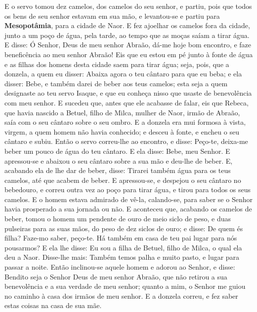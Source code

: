 E o servo tomou dez camelos, dos camelos do seu senhor, e partiu,
pois que todos os bens de seu senhor estavam em sua mão, e
levantou-se e partiu para \textbf{Mesopotâmia}, para a cidade de
Naor. E fez ajoelhar os camelos fora da cidade, junto a um
poço de água, pela tarde, ao tempo que as moças saíam a tirar água.
E disse: Ó Senhor, Deus de meu senhor Abraão, dá-me hoje bom
encontro, e faze beneficência ao meu senhor Abraão! Eis que
eu estou em pé junto à fonte de água e as filhas dos homens desta
cidade saem para tirar água; seja, pois, que a donzela, a
quem eu disser: Abaixa agora o teu cântaro para que eu beba; e ela
disser: Bebe, e também darei de beber aos teus camelos; esta seja a
quem designaste ao teu servo Isaque, e que eu conheça nisso que
usaste de benevolência com meu senhor. E sucedeu que, antes
que ele acabasse de falar, eis que Rebeca, que havia nascido a
Betuel, filho de Milca, mulher de Naor, irmão de Abraão, saía com o
seu cântaro sobre o seu ombro. E a donzela era mui formosa à
vista, virgem, a quem homem não havia conhecido; e desceu à fonte, e
encheu o seu cântaro e subiu. Então o servo correu-lhe ao
encontro, e disse: Peço-te, deixa-me beber um pouco de água do teu
cântaro. E ela disse: Bebe, meu Senhor. E apressou-se e
abaixou o seu cântaro sobre a sua mão e deu-lhe de beber. E,
acabando ela de lhe dar de beber, disse: Tirarei também água para os
teus camelos, até que acabem de beber. E apressou-se, e
despejou o seu cântaro no bebedouro, e correu outra vez ao poço para
tirar água, e tirou para todos os seus camelos. E o homem
estava admirado de vê-la, calando-se, para saber se o Senhor havia
prosperado a sua jornada ou não. E aconteceu que, acabando os
camelos de beber, tomou o homem um pendente de ouro de meio siclo de
peso, e duas pulseiras para as suas mãos, do peso de dez siclos de
ouro; e disse: De quem és filha? Faze-mo saber, peço-te. Há
também em casa de teu pai lugar para nós pousarmos? E ela lhe
disse: Eu sou a filha de Betuel, filho de Milca, o qual ela deu a
Naor. Disse-lhe mais: Também temos palha e muito pasto, e
lugar para passar a noite. Então inclinou-se aquele homem e
adorou ao Senhor, e disse: Bendito seja o Senhor Deus de meu
senhor Abraão, que não retirou a sua benevolência e a sua verdade de
meu senhor; quanto a mim, o Senhor me guiou no caminho à casa dos
irmãos de meu senhor. E a donzela correu, e fez saber estas
coisas na casa de sua mãe.

